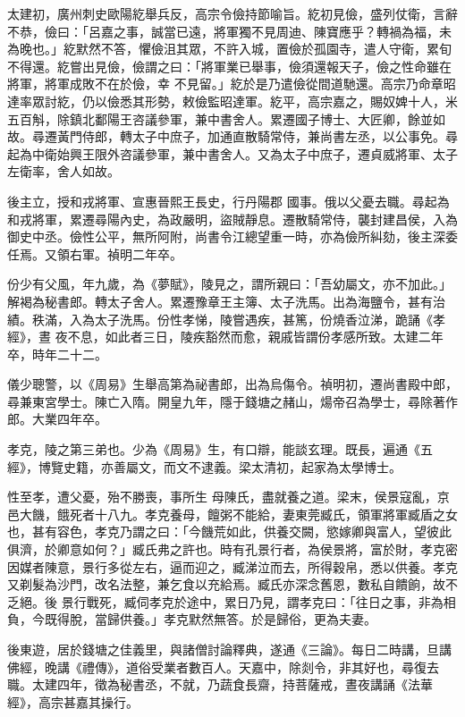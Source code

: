 \begin{pinyinscope}
 太建初，廣州刺史歐陽紇舉兵反，高宗令儉持節喻旨。紇初見儉，盛列仗衛，言辭不恭，儉曰：「呂嘉之事，誠當已遠，將軍獨不見周迪、陳寶應乎？轉禍為福，未為晚也。」紇默然不答，懼儉沮其眾，不許入城，置儉於孤園寺，遣人守衛，累旬不得還。紇嘗出見儉，儉謂之曰：「將軍業已舉事，儉須還報天子，儉之性命雖在將軍，將軍成敗不在於儉，幸
 不見留。」紇於是乃遣儉從間道馳還。高宗乃命章昭達率眾討紇，仍以儉悉其形勢，敕儉監昭達軍。紇平，高宗嘉之，賜奴婢十人，米五百斛，除鎮北鄱陽王咨議參軍，兼中書舍人。累遷國子博士、大匠卿，餘並如故。尋遷黃門侍郎，轉太子中庶子，加通直散騎常侍，兼尚書左丞，以公事免。尋起為中衛始興王限外咨議參軍，兼中書舍人。又為太子中庶子，遷貞威將軍、太子左衛率，舍人如故。



 後主立，授和戎將軍、宣惠晉熙王長史，行丹陽郡
 國事。俄以父憂去職。尋起為和戎將軍，累遷尋陽內史，為政嚴明，盜賊靜息。遷散騎常侍，襲封建昌侯，入為御史中丞。儉性公平，無所阿附，尚書令江總望重一時，亦為儉所糾劾，後主深委任焉。又領右軍。禎明二年卒。



 份少有父風，年九歲，為《夢賦》，陵見之，謂所親曰：「吾幼屬文，亦不加此。」解褐為秘書郎。轉太子舍人。累遷豫章王主簿、太子洗馬。出為海鹽令，甚有治績。秩滿，入為太子洗馬。份性孝悌，陵嘗遇疾，甚篤，份燒香泣涕，跪誦《孝經》，晝
 夜不息，如此者三日，陵疾豁然而愈，親戚皆謂份孝感所致。太建二年卒，時年二十二。



 儀少聰警，以《周易》生舉高第為祕書郎，出為烏傷令。禎明初，遷尚書殿中郎，尋兼東宮學士。陳亡入隋。開皇九年，隱于錢塘之赭山，煬帝召為學士，尋除著作郎。大業四年卒。



 孝克，陵之第三弟也。少為《周易》生，有口辯，能談玄理。既長，遍通《五經》，博覽史籍，亦善屬文，而文不逮義。梁太清初，起家為太學博士。



 性至孝，遭父憂，殆不勝喪，事所生
 母陳氏，盡就養之道。梁末，侯景寇亂，京邑大饑，餓死者十八九。孝克養母，饘粥不能給，妻東莞臧氏，領軍將軍臧盾之女也，甚有容色，孝克乃謂之曰：「今饑荒如此，供養交闕，慾嫁卿與富人，望彼此俱濟，於卿意如何？」臧氏弗之許也。時有孔景行者，為侯景將，富於財，孝克密因媒者陳意，景行多從左右，逼而迎之，臧涕泣而去，所得穀帛，悉以供養。孝克又剃髮為沙門，改名法整，兼乞食以充給焉。臧氏亦深念舊恩，數私自饋餉，故不乏絕。後
 景行戰死，臧伺孝克於途中，累日乃見，謂孝克曰：「往日之事，非為相負，今既得脫，當歸供養。」孝克默然無答。於是歸俗，更為夫妻。



 後東遊，居於錢塘之佳義里，與諸僧討論釋典，遂通《三論》。每日二時講，旦講佛經，晚講《禮傳》，道俗受業者數百人。天嘉中，除剡令，非其好也，尋復去職。太建四年，徵為秘書丞，不就，乃蔬食長齋，持菩薩戒，晝夜講誦《法華經》，高宗甚嘉其操行。




\end{pinyinscope}
